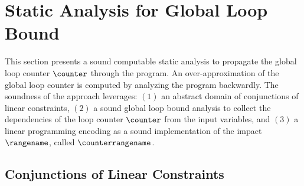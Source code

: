 \section{Static Analysis for Global Loop Bound}

This section presents a sound computable static analysis to propagate the global loop counter $\counter$ through the program.
An over-approximation of the global loop counter is computed by analyzing the program backwardly.
The soundness of the approach leverages: $(1)$ an abstract domain of conjunctions of linear constraints, $(2)$ a sound global loop bound analysis to collect the dependencies of the loop counter $\counter$ from the input variables, and $(3)$ a linear programming encoding as a sound implementation of the impact $\rangename$, called $\counterrangename$.

\subsection{Conjunctions of Linear Constraints}

